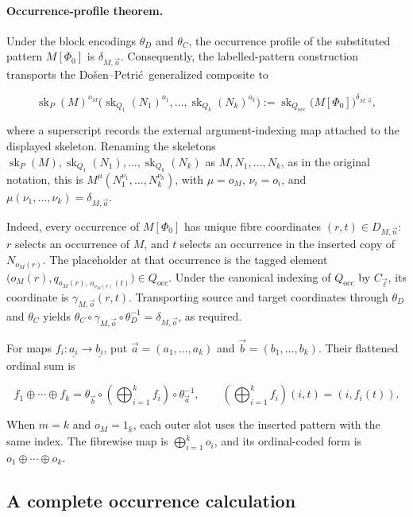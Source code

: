 \documentclass[11pt]{article}
\newcommand{\finord}[1]{\underline{#1}}
\newcommand{\DP}{Do\v{s}en--Petri\'{c}}
\theoremstyle{definition}
\begin{document}
\paragraph{Occurrence-profile theorem.}
Under the block encodings \(\theta_D\) and \(\theta_C\), the occurrence
profile of the substituted pattern \(M[\Phi_0]\) is
\(\delta_{M,\vec o}\). Consequently, the labelled-pattern construction
transports the \DP\ generalized composite to

\[
\operatorname{sk}_P(M)^{o_M}
\bigl(\operatorname{sk}_{Q_1}(N_1)^{o_1},\ldots,
      \operatorname{sk}_{Q_k}(N_k)^{o_k}\bigr)
:=\operatorname{sk}_{Q_{\mathrm{occ}}}\bigl(M[\Phi_0]\bigr)^{\delta_{M,\vec o}},
\]

where a superscript records the external argument-indexing map attached to the
displayed skeleton. Renaming the skeletons
\(\operatorname{sk}_P(M),\operatorname{sk}_{Q_1}(N_1),\ldots,
\operatorname{sk}_{Q_k}(N_k)\) as \(M,N_1,\ldots,N_k\), as in the original
notation, this is
\(M^\mu(N_1^{\nu_1},\ldots,N_k^{\nu_k})\), with
\(\mu=o_M\), \(\nu_i=o_i\), and
\(\mu(\nu_1,\ldots,\nu_k)=\delta_{M,\vec o}\).

Indeed, every occurrence of \(M[\Phi_0]\) has unique fibre coordinates
\((r,t)\in D_{M,\vec n}\): \(r\) selects an occurrence of \(M\), and \(t\)
selects an occurrence in the inserted copy of \(N_{o_M(r)}\). The placeholder
at that occurrence is the tagged element
\(\bigl(o_M(r),q_{o_M(r),\,o_{o_M(r)}(t)}\bigr)\in Q_{\mathrm{occ}}\).
Under the canonical indexing of \(Q_{\mathrm{occ}}\) by \(C_{\vec\ell}\), its
coordinate is \(\gamma_{M,\vec o}(r,t)\). Transporting source and target
coordinates through \(\theta_D\) and \(\theta_C\) yields
\(\theta_C\circ\gamma_{M,\vec o}\circ\theta_D^{-1}
=\delta_{M,\vec o}\), as required.

For maps \(f_i:\finord{a_i}\to\finord{b_i}\), put
\(\vec a=(a_1,\ldots,a_k)\) and \(\vec b=(b_1,\ldots,b_k)\). Their
flattened ordinal sum is

\[
f_1\oplus\cdots\oplus f_k
=\theta_{\vec b}\circ
 \left(\bigoplus_{i=1}^{k}f_i\right)
 \circ\theta_{\vec a}^{-1},
\qquad
\left(\bigoplus_{i=1}^{k}f_i\right)(i,t)=(i,f_i(t)).
\]

When \(m=k\) and \(o_M=1_{\finord k}\), each outer slot uses the inserted
pattern with the same index. The fibrewise map is
\(\bigoplus_{i=1}^{k}o_i\), and its ordinal-coded form is
\(o_1\oplus\cdots\oplus o_k\).

\subsection{A complete occurrence calculation}
\end{document}
